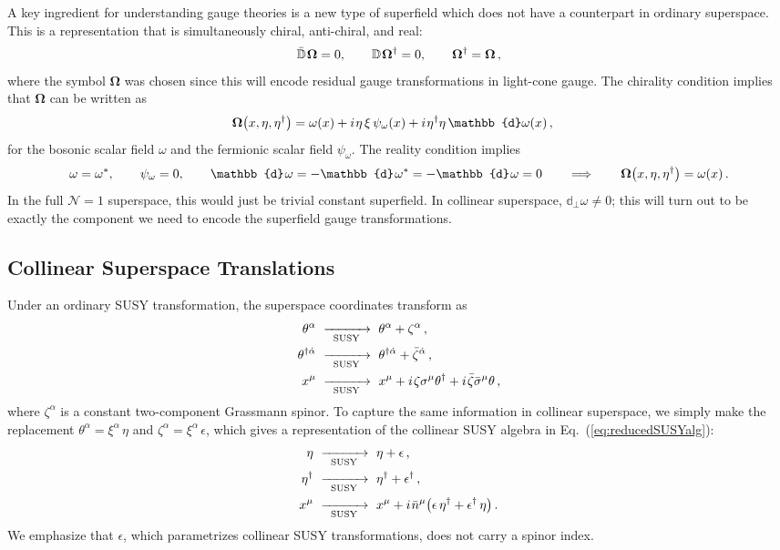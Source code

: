 \documentclass[12pt,document,nofootinbib,superscriptaddress,onecolumn,preprintnumbers,balancelastpage]{article}
\newcommand{\s}{\hspace{0.8pt}}
\newcommand{\PP}{\mathbb{d}}
\newcommand{\susy}{\,\,\xrightarrow[\hspace{5pt}\text{SUSY}\hspace{5pt}]{}\,\,}
\DeclareRobustCommand{\Eq}[1]{Eq.~(\ref{#1})}
\newcommand{\D}{\mathbb{D}}
\newcommand{\RCA}{\boldsymbol{\Omega}}
\begin{document}
\begin{spacing}{1.2}
A key ingredient for understanding gauge theories is a new type of superfield which does not have a counterpart in ordinary superspace.
%
This is a representation that is simultaneously chiral, anti-chiral, and real:
\begin{align}
\bar{\D}\s \RCA = 0, \qquad \D\s \RCA^\dagger = 0, \qquad \RCA^\dagger = \RCA\,,
\end{align}
where the symbol $\RCA$ was chosen since this will encode residual gauge transformations in light-cone gauge.
%
The chirality condition implies that $\RCA$ can be written as 
\begin{align}
\RCA\big(x,\eta,\eta^\dagger\big) &= \omega(x) + i\s \eta\, \xi\, \psi_\omega(x) + i\s \eta^\dagger \eta \, \PP \omega(x)\,,
\end{align}
for the bosonic scalar field $\omega$ and the fermionic scalar field $\psi_\omega$.
%
The reality condition implies
\begin{align}
\label{eq:RCA}
\omega = \omega^*, \qquad \psi_\omega = 0, \qquad \PP\s \omega = - \PP\s \omega^* = -\PP\s \omega = 0 \qquad \Longrightarrow \qquad \RCA\big(x,\eta,\eta^\dagger\big) = \omega(x)\,.
\end{align}
In the full $\mathcal{N} = 1$ superspace, this would just be trivial constant superfield.
%
In collinear superspace, $\PP_\perp \omega \neq 0$; this will turn out to be exactly the component we need to encode the superfield gauge transformations.

\subsection{Collinear Superspace Translations} 
\label{sec:SUSYTrans}

Under an ordinary SUSY transformation, the superspace coordinates transform as
\begin{align}
\theta^\alpha &\susy \theta^\alpha + \zeta^\alpha \,, \nonumber\\
\theta^{\dagger \dot{\alpha}} &\susy \theta^{\dagger \dot{\alpha}} + \bar{\zeta}^{\dot{\alpha}} \, , \nonumber\\
x^\mu &\susy x^\mu +  i\s\zeta\sigma^\mu\theta^{\dagger}+i\s\bar{\zeta}\bar{\sigma}^\mu \theta \, ,
\end{align}
where $\zeta^\alpha$ is a constant two-component Grassmann spinor.
%
To capture the same information in collinear superspace, we simply make the replacement $\theta^\alpha = \xi^\alpha\, \eta$ and $\zeta^\alpha = \xi^\alpha\, \epsilon$, which gives a representation of the collinear SUSY algebra in \Eq{eq:reducedSUSYalg}:  
\begin{align}
\eta &\susy \eta + \epsilon \, , \nonumber \\ 
\eta^\dagger &\susy \eta^\dagger + \epsilon^\dagger \,, \nonumber \\ 
x^\mu &\susy x^\mu + i \s\bar{n}^\mu \big(\epsilon\, \eta^\dagger  + \epsilon^\dagger\, \eta\big)\,.
\end{align}
We emphasize that $\epsilon$, which parametrizes collinear SUSY transformations, does not carry a spinor index.


\end{spacing}
\end{document}
